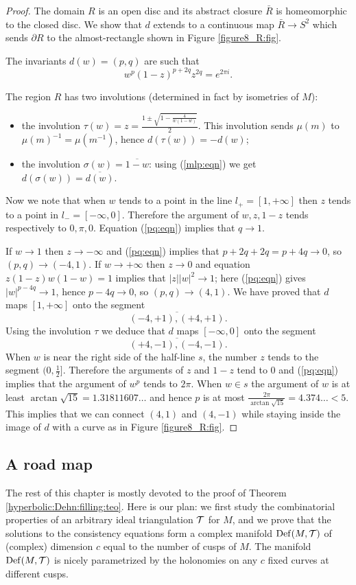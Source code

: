 \begin{proof}
The domain $R$ is an open disc and its abstract closure $\bar R$ is homeomorphic to the closed disc. We show that $d$ extends to a continuous map $\bar R \to S^2$ which sends $\partial R$ to the almost-rectangle shown in Figure \ref{figure8_R:fig}. 

The invariants $d(w) = (p,q)$ are such that
\begin{equation} \label{pq:eqn}
w^p(1-z)^{p+2q}z^{2q} = e^{2\pi i}.
\end{equation}

The region $R$ has two involutions (determined in fact by isometries of $M$):
\begin{itemize}
\item the involution $\tau(w) = z = \frac{1 \pm \sqrt{1-\frac 4{w(1-w)}}}{2}$. This involution sends $\mu(m)$ to $\mu(m)^{-1} = \mu(m^{-1})$, hence $d(\tau(w)) = -d(w)$;
\item the involution $\sigma(w) = \overline{1-w}$: using (\ref{mlp:eqn}) we get $d(\sigma(w)) = \overline{d(w)}$.
\end{itemize}
Now we note that when $w$ tends to a point in the line $l_+ = [1, +\infty]$ then $z$ tends to a point in $l_- = [-\infty,0]$. Therefore the argument of $w,z,1-z$
tends respectively to $0, \pi, 0$. Equation (\ref{pq:eqn}) implies that $q \to 1$.

If $w\to 1$ then $z \to -\infty$ and (\ref{pq:eqn}) implies that $p+2q+2q=p+4q\to 0$, so $(p,q)\to (-4,1)$. If $w\to +\infty$ then $z \to 0$ and equation $z(1-z)w(1-w)=1$ implies that $|z||w|^2\to 1$; here (\ref{pq:eqn}) gives $|w|^{p-4q}\to 1$, hence $p-4q\to 0$, so $(p,q)\to (4,1)$. We have proved that $d$ maps $[1,+\infty]$ onto the segment 
$$\overline{(-4,+1), (+4,+1)}.$$
Using the involution $\tau$ we deduce that $d$ maps $[-\infty, 0]$ onto the segment
$$\overline{(+4,-1),(-4,-1)}.$$
When $w$ is near the right side of the half-line $s$, the number $z$ tends to the segment $(0,\frac 12]$. Therefore the arguments of $z$ and $1-z$ tend to $0$ and (\ref{pq:eqn}) implies that the argument of $w^p$ tends to $2\pi$. When $w\in s$ the argument of $w$ is at least $\arctan \sqrt{15} = 1.31811607\ldots $ and hence $p$ is at most $\frac{2\pi}{\arctan \sqrt{15}} = 4.374\ldots < 5$. This implies that we can connect $(4,1)$ and $(4,-1)$ while staying inside the image of $d$ with a curve as in Figure \ref{figure8_R:fig}.
\end{proof}

\subsection{A road map} \label{sketch:filling:subsection}
The rest of this chapter is mostly devoted to the proof of Theorem \ref{hyperbolic:Dehn:filling:teo}. Here is our plan: we first study the combinatorial properties of an arbitrary ideal triangulation $\mathcal{T}$ for $M$, and we prove that the solutions to the consistency equations form a complex manifold ${\rm Def}(M,\mathcal{T})$ of (complex) dimension $c$ equal to the number of cusps of $M$. The manifold ${\rm Def}(M,\mathcal{T})$ is nicely parametrized by the holonomies on any $c$ fixed curves at different cusps. 

